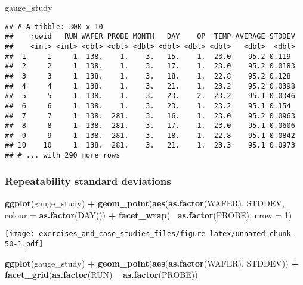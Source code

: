 \documentclass[]{book}
\newenvironment{Shaded}{\begin{snugshade}}{\end{snugshade}}
\newcommand{\DataTypeTok}[1]{\textcolor[rgb]{0.13,0.29,0.53}{#1}}
\newcommand{\DecValTok}[1]{\textcolor[rgb]{0.00,0.00,0.81}{#1}}
\newcommand{\KeywordTok}[1]{\textcolor[rgb]{0.13,0.29,0.53}{\textbf{#1}}}
\newcommand{\NormalTok}[1]{#1}
\newcommand{\OperatorTok}[1]{\textcolor[rgb]{0.81,0.36,0.00}{\textbf{#1}}}
\newcommand{\StringTok}[1]{\textcolor[rgb]{0.31,0.60,0.02}{#1}}
\theoremstyle{definition}
\theoremstyle{definition}
\theoremstyle{definition}
\theoremstyle{remark}
\begin{document}
\begin{Shaded}
\begin{Highlighting}[]
\NormalTok{gauge_study}
\end{Highlighting}
\end{Shaded}

\begin{verbatim}
## # A tibble: 300 x 10
##    rowid   RUN WAFER PROBE MONTH   DAY    OP  TEMP AVERAGE STDDEV
##    <int> <int> <dbl> <dbl> <dbl> <dbl> <dbl> <dbl>   <dbl>  <dbl>
##  1     1     1  138.    1.    3.   15.    1.  23.0    95.2 0.119 
##  2     2     1  138.    1.    3.   17.    1.  23.0    95.2 0.0183
##  3     3     1  138.    1.    3.   18.    1.  22.8    95.2 0.128 
##  4     4     1  138.    1.    3.   21.    1.  23.2    95.2 0.0398
##  5     5     1  138.    1.    3.   23.    2.  23.2    95.1 0.0346
##  6     6     1  138.    1.    3.   23.    1.  23.2    95.1 0.154 
##  7     7     1  138.  281.    3.   16.    1.  23.0    95.2 0.0963
##  8     8     1  138.  281.    3.   17.    1.  23.0    95.1 0.0606
##  9     9     1  138.  281.    3.   18.    1.  22.8    95.1 0.0842
## 10    10     1  138.  281.    3.   21.    1.  23.3    95.1 0.0973
## # ... with 290 more rows
\end{verbatim}

\hypertarget{repeatability-standard-deviations}{%
\subsubsection{Repeatability standard
deviations}\label{repeatability-standard-deviations}}

\begin{Shaded}
\begin{Highlighting}[]
\KeywordTok{ggplot}\NormalTok{(gauge_study) }\OperatorTok{+}
\StringTok{  }\KeywordTok{geom_point}\NormalTok{(}\KeywordTok{aes}\NormalTok{(}\KeywordTok{as.factor}\NormalTok{(WAFER), STDDEV, }\DataTypeTok{colour =} \KeywordTok{as.factor}\NormalTok{(DAY))) }\OperatorTok{+}
\StringTok{  }\KeywordTok{facet_wrap}\NormalTok{(}\OperatorTok{~}\StringTok{ }\KeywordTok{as.factor}\NormalTok{(PROBE), }\DataTypeTok{nrow =} \DecValTok{1}\NormalTok{)}
\end{Highlighting}
\end{Shaded}

\texttt{[image: exercises\_and\_case\_studies\_files/figure-latex/unnamed-chunk-50-1.pdf]}

\begin{Shaded}
\begin{Highlighting}[]
\KeywordTok{ggplot}\NormalTok{(gauge_study) }\OperatorTok{+}
\StringTok{  }\KeywordTok{geom_point}\NormalTok{(}\KeywordTok{aes}\NormalTok{(}\KeywordTok{as.factor}\NormalTok{(WAFER), STDDEV)) }\OperatorTok{+}
\StringTok{  }\KeywordTok{facet_grid}\NormalTok{(}\KeywordTok{as.factor}\NormalTok{(RUN) }\OperatorTok{~}\StringTok{ }\KeywordTok{as.factor}\NormalTok{(PROBE))}
\end{Highlighting}
\end{Shaded}
\end{document}
